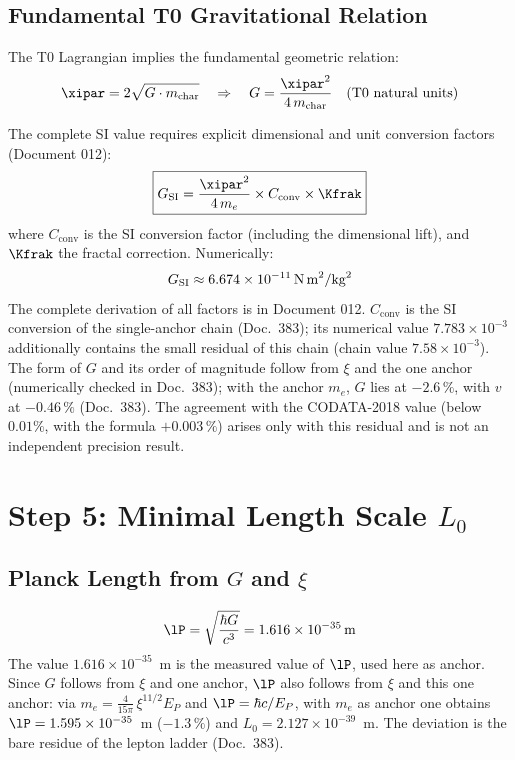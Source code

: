 \subsection{Fundamental T0 Gravitational Relation}

The T0 Lagrangian implies the fundamental geometric relation:
\begin{equation}
	\xipar = 2\sqrt{G \cdot m_{\text{char}}}
	\quad \Rightarrow \quad
	G = \frac{\xipar^2}{4\, m_{\text{char}}} \quad \text{(T0 natural units)}
\end{equation}

The complete SI value requires explicit dimensional and unit conversion factors (Document 012):
\begin{equation}
	\boxed{G_{\text{SI}} = \frac{\xipar^2}{4\, m_e} \times C_{\text{conv}} \times \Kfrak}
\end{equation}
where $C_{\text{conv}}$ is the SI conversion factor (including the dimensional lift), and $\Kfrak$ the fractal correction. Numerically:
\begin{equation}
	G_{\text{SI}} \approx 6{.}674 \times 10^{-11}\,\text{N\,m}^2/\text{kg}^2
\end{equation}
The complete derivation of all factors is in Document 012. $C_{\text{conv}}$ is the SI conversion of the single-anchor chain (Doc.~383); its numerical value $7.783\times10^{-3}$ additionally contains the small residual of this chain (chain value $7.58\times10^{-3}$). The form of $G$ and its order of magnitude follow from $\xi$ and the one anchor (numerically checked in Doc.~383); with the anchor $m_e$, $G$ lies at $-2.6\,\%$, with $v$ at $-0.46\,\%$ (Doc.~383). The agreement with the CODATA-2018 value (below $0.01\%$, with the formula $+0.003\,\%$) arises only with this residual and is not an independent precision result.

\section{Step 5: Minimal Length Scale \texorpdfstring{$L_0$}{L0}}

\subsection{Planck Length from \texorpdfstring{$G$}{G} and \texorpdfstring{$\xi$}{xi}}

\begin{equation}
	\lP = \sqrt{\frac{\hbar G}{c^3}} = 1{.}616 \times 10^{-35}\,\text{m}
\end{equation}
The value $1.616\times10^{-35}$~m is the measured value of $\lP$, used here as anchor. Since $G$ follows from $\xi$ and one anchor, $\lP$ also follows from $\xi$ and this one anchor: via $m_e = \tfrac{4}{15\pi}\,\xi^{11/2}E_P$ and $\lP = \hbar c/E_P$, with $m_e$ as anchor one obtains $\lP = 1.595\times10^{-35}$~m ($-1.3\,\%$) and $L_0 = 2.127\times10^{-39}$~m. The deviation is the bare residue of the lepton ladder (Doc.~383).

